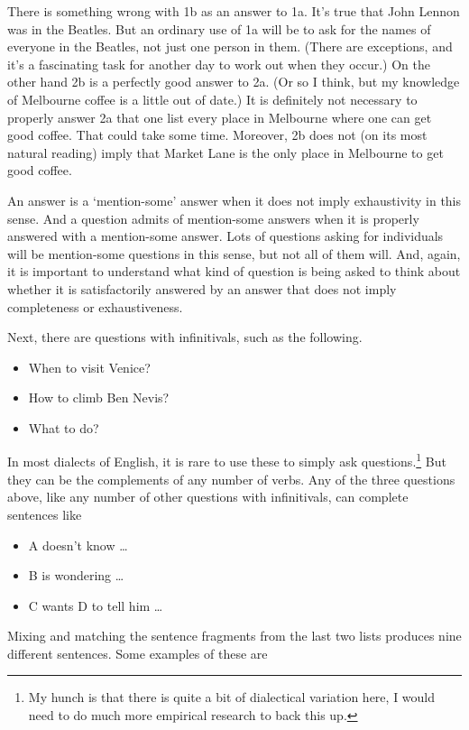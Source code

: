 \documentclass[
  10pt,
  letterpaper,
  twoside]{scrbook}
\providecommand{\tightlist}{%
  \setlength{\itemsep}{0pt}\setlength{\parskip}{0pt}}\usepackage{longtable,booktabs,array}
\begin{document}
There is something wrong with 1b as an answer to 1a. It's true that John
Lennon was in the Beatles. But an ordinary use of 1a will be to ask for
the names of everyone in the Beatles, not just one person in them.
(There are exceptions, and it's a fascinating task for another day to
work out when they occur.) On the other hand 2b is a perfectly good
answer to 2a. (Or so I think, but my knowledge of Melbourne coffee is a
little out of date.) It is definitely not necessary to properly answer
2a that one list every place in Melbourne where one can get good coffee.
That could take some time. Moreover, 2b does not (on its most natural
reading) imply that Market Lane is the only place in Melbourne to get
good coffee.

An answer is a `mention-some' answer when it does not imply exhaustivity
in this sense. And a question admits of mention-some answers when it is
properly answered with a mention-some answer. Lots of questions asking
for individuals will be mention-some questions in this sense, but not
all of them will. And, again, it is important to understand what kind of
question is being asked to think about whether it is satisfactorily
answered by an answer that does not imply completeness or
exhaustiveness.

Next, there are questions with infinitivals, such as the following.

\begin{itemize}
\tightlist
\item
  When to visit Venice?
\item
  How to climb Ben Nevis?
\item
  What to do?
\end{itemize}

In most dialects of English, it is rare to use these to simply ask
questions.\footnote{My hunch is that there is quite a bit of dialectical
  variation here, I would need to do much more empirical research to
  back this up.} But they can be the complements of any number of verbs.
Any of the three questions above, like any number of other questions
with infinitivals, can complete sentences like

\begin{itemize}
\tightlist
\item
  A doesn't know \ldots{}
\item
  B is wondering \ldots{}
\item
  C wants D to tell him \ldots{}
\end{itemize}

Mixing and matching the sentence fragments from the last two lists
produces nine different sentences. Some examples of these are
\end{document}
